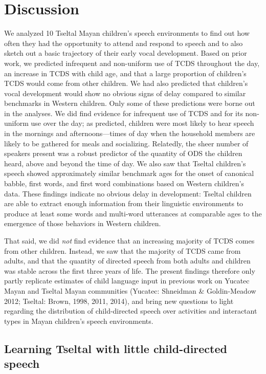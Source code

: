 \documentclass[floatsintext,man]{apa6}
\theoremstyle{definition}
\theoremstyle{definition}
\theoremstyle{definition}
\theoremstyle{remark}
\begin{document}
\hypertarget{disc}{\section{Discussion}\label{disc}}

We analyzed 10 Tseltal Mayan children's speech environments to find out
how often they had the opportunity to attend and respond to speech and
to also sketch out a basic trajectory of their early vocal development.
Based on prior work, we predicted infrequent and non-uniform use of TCDS
throughout the day, an increase in TCDS with child age, and that a large
proportion of children's TCDS would come from other children. We had
also predicted that children's vocal development would show no obvious
signs of delay compared to similar benchmarks in Western children. Only
some of these predictions were borne out in the analyses. We did find
evidence for infrequent use of TCDS and for its non-uniform use over the
day; as predicted, children were most likely to hear speech in the
mornings and afternoons---times of day when the household members are
likely to be gathered for meals and socializing. Relatedly, the sheer
number of speakers present was a robust predictor of the quantity of ODS
the children heard, above and beyond the time of day. We also saw that
Tseltal children's speech showed approximately similar benchmark ages
for the onset of canonical babble, first words, and first word
combinations based on Western children's data. These findings indicate
no obvious delay in development: Tseltal children are able to extract
enough information from their linguistic environments to produce at
least some words and multi-word utterances at comparable ages to the
emergence of those behaviors in Western children.

That said, we did \emph{not} find evidence that an increasing majority
of TCDS comes from other children. Instead, we saw that the majority of
TCDS came from adults, and that the quantity of directed speech from
both adults and children was stable across the first three years of
life. The present findings therefore only partly replicate estimates of
child language input in previous work on Yucatec Mayan and Tseltal Mayan
communities (Yucatec: Shneidman \& Goldin-Meadow 2012; Tseltal: Brown,
1998, 2011, 2014), and bring new questions to light regarding the
distribution of child-directed speech over activities and interactant
types in Mayan children's speech environments.

\subsection{Learning Tseltal with little child-directed
speech}\label{learning-tseltal-with-little-child-directed-speech}
\end{document}

